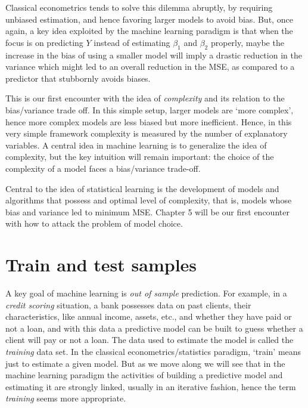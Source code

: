 Classical econometrics tends to solve this dilemma abruptly, by requiring unbiased estimation, and hence favoring larger models to avoid bias. But, once again, a key idea exploited by the machine learning paradigm is that when the focus is on predicting $Y$ instead of estimating $\beta_1$ and $\beta_2$ properly, maybe the increase in the bias of using a smaller model will imply a drastic reduction in the variance which might led to an overall reduction in the MSE, as compared to a predictor that stubbornly avoids biases.

This is our first encounter with the idea of {\it complexity} and its relation to the bias/variance trade off. In this simple setup, larger models are `more complex', hence more complex models are less biased but more inefficient. Hence, in this very simple framework complexity is measured by the number of explanatory variables. A central idea in machine learning is to generalize the idea of complexity, but the key intuition will remain important: the choice of the complexity of a model faces a bias/variance trade-off.

Central to the idea of statistical learning is the development of models and algorithms that possess and optimal level of complexity, that is, models whose bias and variance led to minimum MSE. Chapter 5 will be our first encounter with how to attack the problem of model choice.



\section{Train and test samples}

A key goal of machine learning is \emph{out of sample} prediction. For example, in a \emph{credit scoring} situation, a bank possesses data on past clients, their characteristics, like annual income, assets, etc., and whether they have paid or not a loan, and with this data a predictive model can be built to guess whether a client will pay or not a loan. The data used to estimate the model is called the \emph{training} data set. In the classical econometrics/statistics paradigm, `train' means just to estimate a given model. But as we move along we will see that in the machine learning paradigm the activities of building a predictive model and estimating it are strongly linked, usually in an iterative fashion, hence the term \emph{training} seems more appropriate. 

